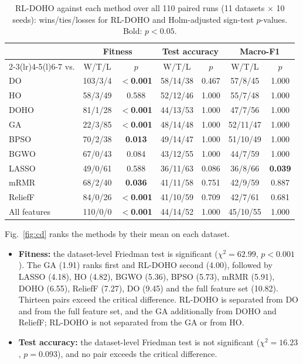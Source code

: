 \documentclass[pdflatex,sn-basic]{sn-jnl}
\begin{document}
\begin{table}[t]
\centering
\caption{RL-DOHO against each method over all 110 paired runs (11 datasets $\times$ 10 seeds): wins/ties/losses for RL-DOHO and Holm-adjusted sign-test $p$-values. Bold: $p<0.05$.}
\label{tab:pooled}
\footnotesize
\setlength{\tabcolsep}{2.6pt}
\begin{tabular}{@{}lcccccc@{}}
\toprule
& \multicolumn{2}{c}{Fitness} & \multicolumn{2}{c}{Test accuracy} & \multicolumn{2}{c}{Macro-F1} \\
\cmidrule(lr){2-3}\cmidrule(lr){4-5}\cmidrule(l){6-7}
vs. & W/T/L & $p$ & W/T/L & $p$ & W/T/L & $p$ \\
\midrule
DO & 103/3/4 & \textbf{$<$0.001} & 58/14/38 & 0.467 & 57/8/45 & 1.000 \\
HO & 58/3/49 & 0.588 & 52/12/46 & 1.000 & 55/7/48 & 1.000 \\
DOHO & 81/1/28 & \textbf{$<$0.001} & 44/13/53 & 1.000 & 47/7/56 & 1.000 \\
\midrule
GA & 22/3/85 & \textbf{$<$0.001} & 48/14/48 & 1.000 & 52/11/47 & 1.000 \\
BPSO & 70/2/38 & \textbf{0.013} & 49/14/47 & 1.000 & 51/10/49 & 1.000 \\
BGWO & 67/0/43 & 0.084 & 43/12/55 & 1.000 & 44/7/59 & 1.000 \\
\midrule
LASSO & 49/0/61 & 0.588 & 36/11/63 & 0.086 & 36/8/66 & \textbf{0.039} \\
mRMR & 68/2/40 & \textbf{0.036} & 41/11/58 & 0.751 & 42/9/59 & 0.887 \\
ReliefF & 84/0/26 & \textbf{$<$0.001} & 41/10/59 & 0.709 & 42/7/61 & 0.681 \\
All features & 110/0/0 & \textbf{$<$0.001} & 44/14/52 & 1.000 & 45/10/55 & 1.000 \\
\bottomrule
\end{tabular}
\end{table}

Fig.~\ref{fig:cd} ranks the methods by their mean on each dataset.
\begin{itemize}
\item \textbf{Fitness:} the dataset-level Friedman test is significant ($\chi^2=62.99$, $p<0.001$). The GA (1.91) ranks first and RL-DOHO second (4.00), followed by LASSO (4.18), HO (4.82), BGWO (5.36), BPSO (5.73), mRMR (5.91), DOHO (6.55), ReliefF (7.27), DO (9.45) and the full feature set (10.82). Thirteen pairs exceed the critical difference. RL-DOHO is separated from DO and from the full feature set, and the GA additionally from DOHO and ReliefF; RL-DOHO is not separated from the GA or from HO.
\item \textbf{Test accuracy:} the dataset-level Friedman test is not significant ($\chi^2=16.23$, $p=0.093$), and no pair exceeds the critical difference.
\end{itemize}
\end{document}
